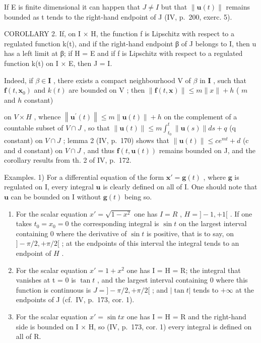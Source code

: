 If E is finite dimensional it can happen that \(J \neq I\) but that \(\|\mathbf{u}(t)\|\) remains bounded as t tends to the right-hand endpoint of J (IV, p.~200, exerc. 5).

COROLLARY 2. If, on I × H, the function f is Lipschitz with respect to a regulated function k(t), and if the right-hand endpoint β of J belongs to I, then u has a left limit at β; if H = E and if f is Lipschitz with respect to a regulated function k(t) on I × E, then J = I.

Indeed, if \(\beta \in \mathbf{I}\) , there exists a compact neighbourhood \(\mathrm{V}\) of \(\beta\) in \(\mathbf{I}\) , such that \(\mathbf{f}(t, \mathbf{x}_0)\) and \(k(t)\) are bounded on \(\mathrm{V}\) ; then \(\| \mathbf{f}(t, \mathbf{x}) \| \leqslant m \| x \| + h\) ( \(m\) and \(h\) constant)

on \(V \times H\) , whence \(\left\|\mathbf{u}^{\prime}(t)\right\| \leqslant m \left\|\mathbf{u}(t)\right\| + h\) on the complement of a countable subset of \(V \cap J\) , so that \(\left\|\mathbf{u}(t)\right\| \leqslant m \int_{t_{0}}^{t} \left\|\mathbf{u}(s)\right\| ds + q\) (q constant) on \(V \cap J\) ; lemma 2 (IV, p.~170) shows that \(\left\|\mathbf{u}(t)\right\| \leqslant c e^{mt} + d\) (c and d constant) on \(V \cap J\) , and thus \(\mathbf{f}(t, \mathbf{u}(t))\) remains bounded on J, and the corollary results from th. 2 of IV, p.~172.

Examples. 1) For a differential equation of the form \(\mathbf{x}' = \mathbf{g}(t)\) , where \(\mathbf{g}\) is regulated on I, every integral \(\mathbf{u}\) is clearly defined on all of I. One should note that \(\mathbf{u}\) can be bounded on I without \(\mathbf{g}(t)\) being so.

\begin{enumerate}
\def\labelenumi{\arabic{enumi})}
\setcounter{enumi}{1}
\item
  For the scalar equation \(x' = \sqrt{1 - x^2}\) one has \(I = R\) , \(H = ] - 1, +1[\) . If one takes \(t_0 = x_0 = 0\) the corresponding integral is \(\sin t\) on the largest interval containing 0 where the derivative of \(\sin t\) is positive, that is to say, on \(] - \pi / 2, +\pi / 2[\) ; at the endpoints of this interval the integral tends to an endpoint of \(H\) .
\item
  For the scalar equation \(x' = 1 + x^{2}\) one has I = H = R; the integral that vanishes at t = 0 is \(\tan t\) , and the largest interval containing 0 where this function is continuous is \(J = ] - \pi/2, +\pi/2[\) ; and \(|\tan t|\) tends to \(+\infty\) at the endpoints of J (cf.~IV, p.~173, cor. 1).
\item
  For the scalar equation \(x' = \sin tx\) one has I = H = R and the right-hand side is bounded on I × H, so (IV, p.~173, cor. 1) every integral is defined on all of R.
\end{enumerate}

